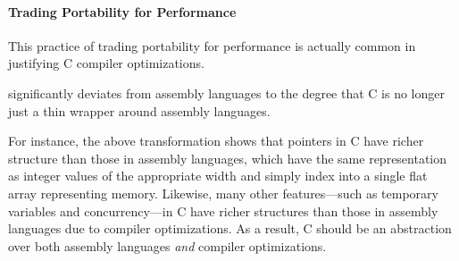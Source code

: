 \paragraph{Trading Portability for Performance}

This practice of trading portability for performance is actually common in justifying C compiler
optimizations.





significantly deviates from assembly languages to the degree that C is no longer just a thin wrapper
around assembly languages.

For instance, the above transformation shows that pointers in C have richer structure than those in
assembly languages, which have the same representation as integer values of the appropriate width
and simply index into a single flat array representing memory.  Likewise, many other features---such
as temporary variables and concurrency---in C have richer structures than those in assembly
languages due to compiler optimizations.  As a result, C should be an abstraction over both assembly
languages \emph{and} compiler optimizations.












